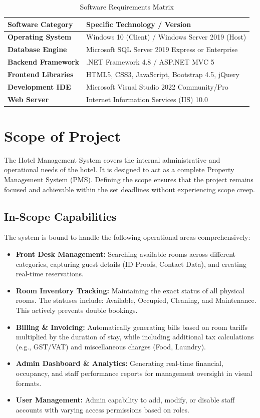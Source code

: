 \documentclass[12pt,a4paper]{article}
\begin{document}
\begin{table}[H]
\centering
\renewcommand{\arraystretch}{1.5}
\begin{tabularx}{\textwidth}{|l|X|}
\hline
\textbf{Software Category} & \textbf{Specific Technology / Version} \\
\hline
\textbf{Operating System} & Windows 10 (Client) / Windows Server 2019 (Host) \\
\hline
\textbf{Database Engine} & Microsoft SQL Server 2019 Express or Enterprise \\
\hline
\textbf{Backend Framework} & .NET Framework 4.8 / ASP.NET MVC 5 \\
\hline
\textbf{Frontend Libraries} & HTML5, CSS3, JavaScript, Bootstrap 4.5, jQuery \\
\hline
\textbf{Development IDE} & Microsoft Visual Studio 2022 Community/Pro \\
\hline
\textbf{Web Server} & Internet Information Services (IIS) 10.0 \\
\hline
\end{tabularx}
\caption{Software Requirements Matrix}
\end{table}

\newpage
\section{Scope of Project}
The Hotel Management System covers the internal administrative and operational needs of the hotel. It is designed to act as a complete Property Management System (PMS). Defining the scope ensures that the project remains focused and achievable within the set deadlines without experiencing scope creep.

\subsection{In-Scope Capabilities}
The system is bound to handle the following operational areas comprehensively:
\begin{itemize}
    \item \textbf{Front Desk Management:} Searching available rooms across different categories, capturing guest details (ID Proofs, Contact Data), and creating real-time reservations.
    \item \textbf{Room Inventory Tracking:} Maintaining the exact status of all physical rooms. The statuses include: Available, Occupied, Cleaning, and Maintenance. This actively prevents double bookings.
    \item \textbf{Billing \& Invoicing:} Automatically generating bills based on room tariffs multiplied by the duration of stay, while including additional tax calculations (e.g., GST/VAT) and miscellaneous charges (Food, Laundry).
    \item \textbf{Admin Dashboard \& Analytics:} Generating real-time financial, occupancy, and staff performance reports for management oversight in visual formats.
    \item \textbf{User Management:} Admin capability to add, modify, or disable staff accounts with varying access permissions based on roles.
\end{itemize}
\end{document}
